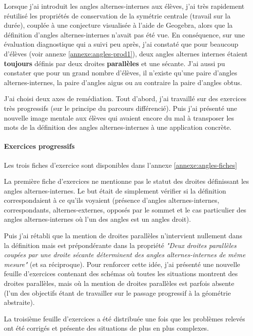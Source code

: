 Lorsque j'ai introduit les angles alternes-internes aux élèves, j'ai très rapidement réutilisé les propriétés de conservation de la symétrie centrale (travail sur la durée), couplée à une conjecture visualisée à l'aide de Geogebra, alors que la définition d'angles alternes-internes n'avait pas été vue. En conséquence, sur une évaluation diagnostique qui a suivi peu après, j'ai constaté que pour beaucoup d'élèves (voir annexe \ref{annexe:angles-prod1}), deux angles alternes internes étaient \textbf{toujours} définis par deux droites \textbf{parallèles} et une sécante. J'ai aussi pu constater que pour un grand nombre d'élèves, il n'existe qu'une paire d'angles alternes-internes, la paire d'angles aigus ou au contraire la paire d'angles obtus. 

J'ai choisi deux axes de remédiation. Tout d'abord, j'ai travaillé sur des exercices très progressifs (sur le principe du parcours différencié). Puis j'ai présenté une nouvelle image mentale aux élèves qui avaient encore du mal à transposer les mots de la définition des angles alternes-internes à une application concrète.

\paragraph{Exercices progressifs}

Les trois fiches d'exercice sont disponibles dans l'annexe \ref{annexe:angles-fiches}

La première fiche d'exercices ne mentionne pas le statut des droites définissant les angles alternes-internes. Le but était de simplement vérifier si la définition correspondaient à ce qu'ils voyaient (présence d'angles alternes-internes, correspondants, alternes-externes, opposés par le sommet et le cas particulier des angles alternes-internes où l'un des angles est un angles droit). 

Puis j'ai rétabli que la mention de droites parallèles n'intervient nullement dans la définition mais est prépondérante dans la propriété \textit{"Deux droites parallèles coupées par une droite sécante déterminent des angles alternes-internes de même mesure"} (et sa réciproque). Pour renforcer cette idée, j'ai présenté une nouvelle feuille d'exercices contenant des schémas où toutes les situations montrent des droites parallèles, mais où la mention de droites parallèles est parfois absente (l'un des objectifs étant de travailler sur le passage progressif à la géométrie abstraite).

La troisième feuille d'exercices a été distribuée une fois que les problèmes relevés ont été corrigés et présente des situations de plus en plus complexes.

